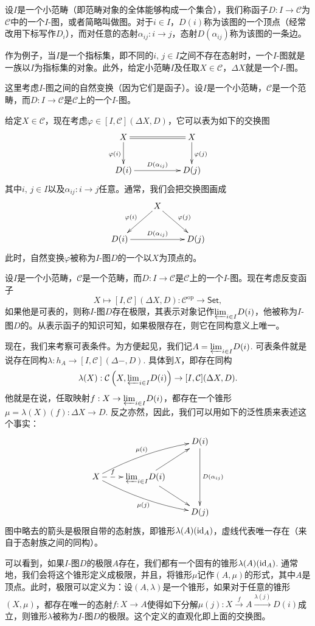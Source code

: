\para 设$I$是一个小范畴（即范畴对象的全体能够构成一个集合），我们称函子$D:I\to \mathcal{C}$为$\mathcal{C}$中的一个$I$-图，或者简略叫做图。对于$i\in I$，$D(i)$称为该图的一个顶点（经常改用下标写作$D_i$），而对任意的态射$\alpha_{ij}:i\to j$，态射$D(\alpha_{ij})$称为该图的一条边。

作为例子，当$I$是一个指标集，即不同的$i$, $j\in I$之间不存在态射时，一个$I$-图就是一族以$I$为指标集的对象。此外，给定小范畴$I$及任取$X\in \mathcal{C}$，$\Delta X$就是一个$I$-图。

\para[锥形] 这里考虑$I$-图之间的自然变换（因为它们是函子）。设$I$是一个小范畴，$\mathcal{C}$是一个范畴，而$D:I\to \mathcal{C}$是$\mathcal{C}$上的一个$I$-图。

给定$X\in\mathcal{C}$，现在考虑$\varphi\in [I,\mathcal{C}](\Delta X,D)$，它可以表为如下的交换图
\[
	\xymatrix{
		X\ar@{=}[rr]\ar[d]_{\varphi(i)}&&X\ar[d]^{\varphi(j)}\\
		D(i)\ar[rr]^-{D(\alpha_{ij})}&&D(j)
	}
\]
其中$i$, $j\in I$以及$\alpha_{ij}:i\to j$任意。通常，我们会把交换图画成
\[
	\xymatrix{
		&X\ar[dl]_{\varphi(i)}\ar[dr]^{\varphi(j)}&\\
		D(i)\ar[rr]^-{D(\alpha_{ij})}&&D(j)
	}
\]
此时，自然变换$\varphi$被称为$I$-图$D$的一个以$X$为顶点的。

\para[极限] 设$I$是一个小范畴，$\mathcal{C}$是一个范畴，而$D:I\to \mathcal{C}$是$\mathcal{C}$上的一个$I$-图。现在考虑反变函子
\[
	X\mapsto [I,\mathcal{C}](\Delta X,D):\mathcal{C}^{\text{op}}\to \mathsf{Set},
\]
如果他是可表的，则称$I$-图$D$存在极限，其表示对象记作${\varprojlim}_{i\in I} D(i)$，他被称为$I$-图$D$的。从表示函子的知识可知，如果极限存在，则它在同构意义上唯一。\endpara

现在，我们来考察可表条件。为方便起见，我们记$A={\varprojlim}_{i\in I} D(i)$. 可表条件就是说存在同构$\lambda:h_{A}\to [I,\mathcal{C}](\Delta -,D)$. 具体到$X$，即存在同构
\[
	\lambda(X):\mathcal{C}\left(X,{\varprojlim}_{i\in I} D(i)\right)\to [I,\mathcal{C}](\Delta X,D).
\]
他就是在说，任取映射$f:X\to {\varprojlim}_{i\in I} D(i)$，都存在一个锥形$\mu=\lambda(X)(f):\Delta X\to D$. 反之亦然，因此，我们可以用如下的泛性质来表述这个事实：
\[
	\xymatrix{
		&&D(i)\ar[dd]^{D(\alpha_{ij})}\\
		X\ar@{-->}[r]^-{f}\ar@/^/[rru]^-{\mu(i)}\ar@/_/[rrd]_{\mu(j)}&{\varprojlim}_{i\in I} D(i)\ar[ru]\ar[rd]&\\
		&&D(j)
	}
\]
图中略去的箭头是极限自带的态射族，即锥形$\lambda(A)(\operatorname{id}_A)$，虚线代表唯一存在（来自于态射族之间的同构）。

可以看到，如果$I$-图$D$的极限$A$存在，我们都有一个固有的锥形$\lambda(A)(\operatorname{id}_A)$. 通常地，我们会将这个锥形定义成极限，并且，将锥形$\mu$记作$(A,\mu)$的形式，其中$A$是顶点。此时，极限可以定义为：设$(A,\lambda)$是一个锥形，如果对于任意的锥形$(X,\mu)$，都存在唯一的态射$f:X\to A$使得如下分解$\mu(j):X\xrightarrow{f}A\xrightarrow{\lambda(j)}D(i)$成立，则锥形$\lambda$被称为$I$-图$D$的极限。这个定义的直观化即上面的交换图。

